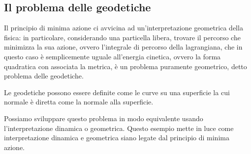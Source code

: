 \documentclass[
10pt, %
a4paper, %
oneside, %
headinclude,footinclude, %
BCOR5mm, %
]{scrartcl}
\begin{document}
\subsection{Il problema delle geodetiche}
Il principio di minima azione ci avvicina ad un'interpretazione geometrica della fisica: in particolare, considerando una particella libera, trovare il percorso che minimizza la sua azione, ovvero l'integrale di percorso della lagrangiana, che in questo caso è semplicemente uguale all'energia cinetica, ovvero la forma quadratica con associata la metrica, è un problema puramente geometrico, detto problema delle geodetiche.
\begin{osservazione}
	Le geodetiche possono essere definite come le curve su una superficie la cui normale è diretta come la normale alla superficie.
\end{osservazione}
Possiamo sviluppare questo problema in modo equivalente usando l'interpretazione dinamica o geometrica. Questo esempio mette in luce come interpretazione dinamica e geometrica siano legate dal principio di minima azione.
\end{document}

